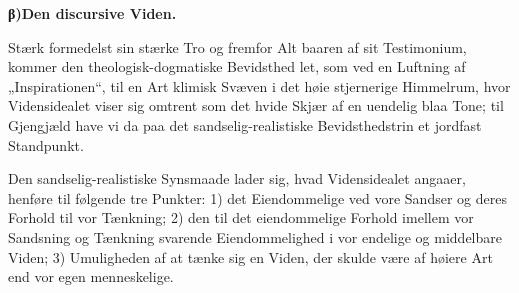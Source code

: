 \documentclass[12pt]{book}
\begin{document}
\begin{center}{\bfseries β)\quad Den discursive Viden.}\end{center}

Stærk formedelst sin stærke Tro og fremfor Alt baaren af sit Testimonium, kommer den
theologisk-dogmatiske Bevidsthed let, som ved en Luftning af „Inspirationen“, til en Art klimisk
Svæven i det høie stjernerige Himmelrum, hvor Vidensidealet viser sig omtrent som det hvide Skjær af
en uendelig blaa Tone; til Gjengjæld have vi da paa det sandselig-realistiske Bevidsthedstrin et
jordfast Standpunkt.

Den sandselig-realistiske Synsmaade lader sig, hvad Vidensidealet angaaer, henføre til følgende tre
Punkter: 1) det Eiendommelige ved vore Sandser og deres Forhold til vor Tænkning; 2) den til det
eiendommelige Forhold imellem vor Sandsning og Tænkning svarende Eiendommelighed i vor endelige og
middelbare Viden; 3) Umuligheden af at tænke sig en Viden, der skulde være af høiere Art end vor
egen menneskelige.
\end{document}
